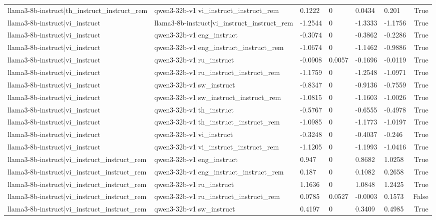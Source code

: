 \begin{table}
\begin{tabular}{llllllr}
llama3-8b-instruct|th_instruct_instruct_rem & qwen3-32b-v1|vi_instruct_instruct_rem & 0.1222 & 0 & 0.0434 & 0.201 & True \\
llama3-8b-instruct|vi_instruct & llama3-8b-instruct|vi_instruct_instruct_rem & -1.2544 & 0 & -1.3333 & -1.1756 & True \\
llama3-8b-instruct|vi_instruct & qwen3-32b-v1|eng_instruct & -0.3074 & 0 & -0.3862 & -0.2286 & True \\
llama3-8b-instruct|vi_instruct & qwen3-32b-v1|eng_instruct_instruct_rem & -1.0674 & 0 & -1.1462 & -0.9886 & True \\
llama3-8b-instruct|vi_instruct & qwen3-32b-v1|ru_instruct & -0.0908 & 0.0057 & -0.1696 & -0.0119 & True \\
llama3-8b-instruct|vi_instruct & qwen3-32b-v1|ru_instruct_instruct_rem & -1.1759 & 0 & -1.2548 & -1.0971 & True \\
llama3-8b-instruct|vi_instruct & qwen3-32b-v1|sw_instruct & -0.8347 & 0 & -0.9136 & -0.7559 & True \\
llama3-8b-instruct|vi_instruct & qwen3-32b-v1|sw_instruct_instruct_rem & -1.0815 & 0 & -1.1603 & -1.0026 & True \\
llama3-8b-instruct|vi_instruct & qwen3-32b-v1|th_instruct & -0.5767 & 0 & -0.6555 & -0.4978 & True \\
llama3-8b-instruct|vi_instruct & qwen3-32b-v1|th_instruct_instruct_rem & -1.0985 & 0 & -1.1773 & -1.0197 & True \\
llama3-8b-instruct|vi_instruct & qwen3-32b-v1|vi_instruct & -0.3248 & 0 & -0.4037 & -0.246 & True \\
llama3-8b-instruct|vi_instruct & qwen3-32b-v1|vi_instruct_instruct_rem & -1.1205 & 0 & -1.1993 & -1.0416 & True \\
llama3-8b-instruct|vi_instruct_instruct_rem & qwen3-32b-v1|eng_instruct & 0.947 & 0 & 0.8682 & 1.0258 & True \\
llama3-8b-instruct|vi_instruct_instruct_rem & qwen3-32b-v1|eng_instruct_instruct_rem & 0.187 & 0 & 0.1082 & 0.2658 & True \\
llama3-8b-instruct|vi_instruct_instruct_rem & qwen3-32b-v1|ru_instruct & 1.1636 & 0 & 1.0848 & 1.2425 & True \\
llama3-8b-instruct|vi_instruct_instruct_rem & qwen3-32b-v1|ru_instruct_instruct_rem & 0.0785 & 0.0527 & -0.0003 & 0.1573 & False \\
llama3-8b-instruct|vi_instruct_instruct_rem & qwen3-32b-v1|sw_instruct & 0.4197 & 0 & 0.3409 & 0.4985 & True \\

\end{tabular}
\end{table}

